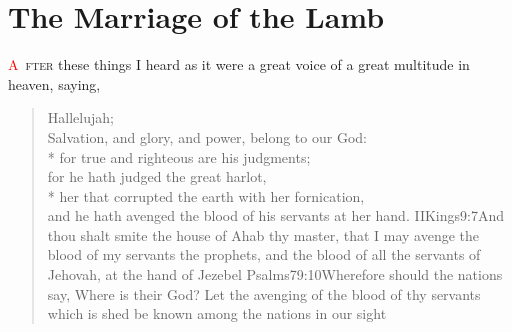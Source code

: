 
\chapter{The Marriage of the Lamb}
\lettrine[lines=3,slope=0.5em, lraise=0.3, lhang=0.2]{\textcolor{red}{A}}{\ fter} these things I heard as it were a great voice of a great multitude%
 in heaven, saying,
\zz \begin{verse}
Hallelujah;\\
Salvation, and glory, and power, belong to our God:\\*\vin
{}for true and righteous are his judgments;\\
for he hath judged the great harlot,\\*\vin
her that corrupted the earth with her fornication,\\
and he hath avenged the blood of his servants at her hand.%
				{IIKings}{9:7}{And thou shalt smite the house of Ahab thy master, that I may avenge the blood of my servants the prophets, and the blood of all the servants of Jehovah, at the hand of Jezebel}%
				{Psalms}{79:10}{Wherefore should the nations say, Where is their God? Let the avenging of the blood of thy servants which is shed be known among the nations in our sight}
\end{verse}

